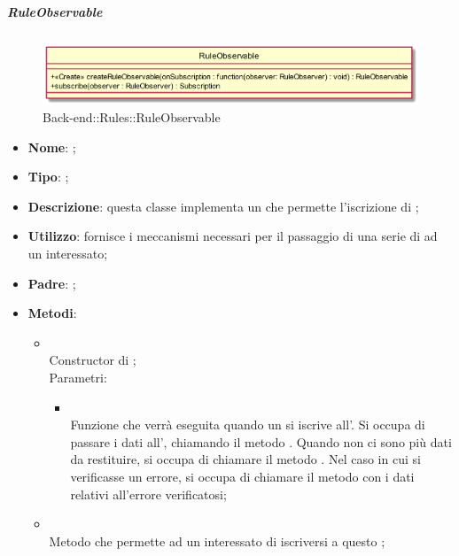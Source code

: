 \hypertarget{RuleObservable_label}{\subparagraph{RuleObservable}}
\begin{figure}[h]
	\centering
	\includegraphics[width=\textwidth,height=\textheight,keepaspectratio]{images/ClassRuleObservable.png}
	\caption{Back-end::Rules::RuleObservable}
\end{figure}
\begin{itemize}
	\item \textbf{Nome}: ;
	\item \textbf{Tipo}: ;
	\item \textbf{Descrizione}: questa classe implementa un  che permette l'iscrizione di ;
	\item \textbf{Utilizzo}: fornisce i meccanismi necessari per il passaggio di una serie di  ad un  interessato;
	\item \textbf{Padre}: ;
	\item \textbf{Metodi}:
	\begin{itemize}
		\item[]  \\		Constructor di ;\\
		Parametri:
		\begin{itemize}
			\item {} \\
			Funzione che verrà eseguita quando un  si iscrive all'. Si occupa di passare i dati all', chiamando il metodo . Quando non ci sono più dati da restituire, si occupa di chiamare il metodo . Nel caso in cui si verificasse un errore, si occupa di chiamare il metodo  con i dati relativi all'errore verificatosi;
		\end{itemize}
		\item[]  \\		Metodo che permette ad un  interessato di iscriversi a questo ;\\

\end{itemize}
\end{itemize}
